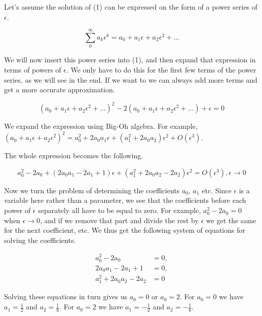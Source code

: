 \documentclass[12pt]{article}
\begin{document}
Let's assume the solution of (1) can be expressed on the form of a power series
of $\epsilon$.

\begin{equation}
\sum_0^{\infty} a_k \epsilon^k = a_0 + a_1 \epsilon + a_2 \epsilon^2 + ...
\end{equation}

We will now insert this power series into (1), and then expand that expression
in terms of powers of $\epsilon$. We only have to do this for the first few
terms of the power series, as we will see in the end. If we want to we can
always add more terms and get a more accurate approximation.

\begin{equation}
(a_0 + a_1 \epsilon + a_2 \epsilon^2 + ...)^2 - 2(a_0 + a_1 \epsilon + a_2
\epsilon^2 + ...) + \epsilon = 0
\end{equation}

We expand the expression using Big-Oh algebra. For example, $(a_0 + a_1 \epsilon
+ a_2 \epsilon^2)^2 = a_0^2 + 2 a_0 a_1 \epsilon + (a_1^2 + 2 a_0 a_2) \epsilon^2 + O(\epsilon^3)$.

The whole expression becomes the following.

\begin{equation}
a_0^2 - 2 a_0 + (2 a_0 a_1 - 2 a_1 + 1)\epsilon + (a_1^2 + 2 a_0 a_2 - 2 a_2)
\epsilon^2 = O(\epsilon^3), \epsilon \to 0
\end{equation}

Now we turn the problem of determining the coefficients $a_0$, $a_1$ etc. Since
$\epsilon$ is a variable here rather than a parameter, we see that the
coefficients before each power of $\epsilon$ separately all have to be equal to
zero. For example, $a_0^2 - 2 a_0 = 0$ when $\epsilon \to 0$, and if we remove
that part and divide the rest by $\epsilon$ we get the same for the next
coefficient, etc. We thus get the following system of equations for solving the
coefficients.

\begin{align}
a_0^2 - 2 a_0 &=0, \\
2 a_0 a_1 - 2 a_1 + 1 &= 0, \\
a_1^2 + 2 a_0 a_2 - 2 a_2 &= 0
\end{align}

Solving these equations in turn gives us $a_0 = 0$ or $a_0 = 2$. For $a_0 = 0$ we
have $a_1 = \frac{1}{2}$ and $a_2 = \frac{1}{8}$. For $a_0 = 2$ we have $a_1 = -
\frac{1}{2}$ and $a_2 = - \frac{1}{8}$.
\end{document}
